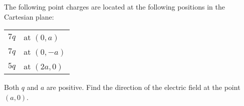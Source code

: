 The following point charges are located at the following positions in the Cartesian plane:

\hspace{10mm}\begin{tabular}{rl}
$7q$ & at $(0,a)$\\
$7q$ & at $(0,-a)$ \\
$5q$ & at $(2a,0)$
\end{tabular}

Both $q$ and $a$ are positive. Find the direction of the electric field at the point $(a,0)$.
